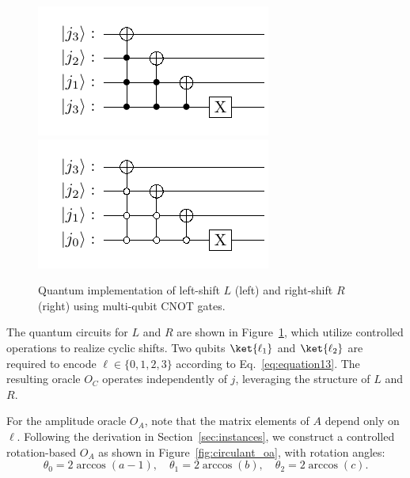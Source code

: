 \documentclass{article}
\begin{document}
    \begin{figure}[htbp]
        \centering
        \includegraphics{pdf/circulant_l_shift} \quad
        \includegraphics{pdf/circulant_r_shift}
        \caption{Quantum implementation of left-shift $L$ (left) and right-shift $R$ (right) using multi-qubit CNOT gates.}
        \label{fig:circulant_lr}
    \end{figure}

    The quantum circuits for $L$ and $R$ are shown in Figure~\ref{fig:circulant_lr}, which utilize controlled operations to realize cyclic shifts. Two qubits $\ket{\ell_1}$ and $\ket{\ell_2}$ are required to encode $\ell \in \{0,1,2,3\}$ according to Eq.~\eqref{eq:equation13}. The resulting oracle $O_C$ operates independently of $j$, leveraging the structure of $L$ and $R$.

    For the amplitude oracle $O_A$, note that the matrix elements of $A$ depend only on $\ell$. Following the derivation in Section~\ref{sec:instances}, we construct a controlled rotation-based $O_A$ as shown in Figure~\ref{fig:circulant_oa}, with rotation angles:
    $$
    \theta_0 = 2\arccos(a-1), \quad
    \theta_1 = 2\arccos(b), \quad
    \theta_2 = 2\arccos(c).
    $$
\end{document}
